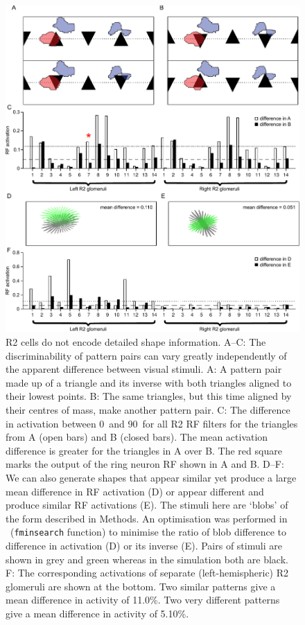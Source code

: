 \begin{figure}[h]
\centering
\includegraphics[width=15cm]{figures/simdiffpatts}
\caption{R2 cells do not encode detailed shape information. A--C: The discriminability of pattern pairs can vary greatly independently of the apparent difference between visual stimuli. A: A pattern pair made up of a triangle and its inverse with both triangles aligned to their lowest points. B: The same triangles, but this time aligned by their centres of mass, make another pattern pair. C: The difference in activation between 0\degree\ and 90\degree\ for all R2 RF filters for the triangles from A (open bars) and B (closed bars). The mean activation difference is greater for the triangles in A over B. The red square marks the output of the ring neuron \ac{RF} shown in A and B. 
D--F: We can also generate shapes that appear similar yet produce a large mean difference in RF activation (D) or appear different and produce similar RF activations (E). The stimuli here are `blobs' of the form described in Methods. An optimisation was performed in \Matlab\ (\texttt{fminsearch} function) to minimise the ratio of blob difference to difference in activation (D) or its inverse (E). Pairs of stimuli are shown in grey and green whereas in the simulation both are black.
F: The corresponding activations of separate (left-hemispheric) R2 glomeruli are shown at the bottom. Two similar patterns give a mean difference in activity of 11.0\%. Two very different patterns give a mean difference in activity of 5.10\%.}
\label{fig:simdiffpatts}
\end{figure}

